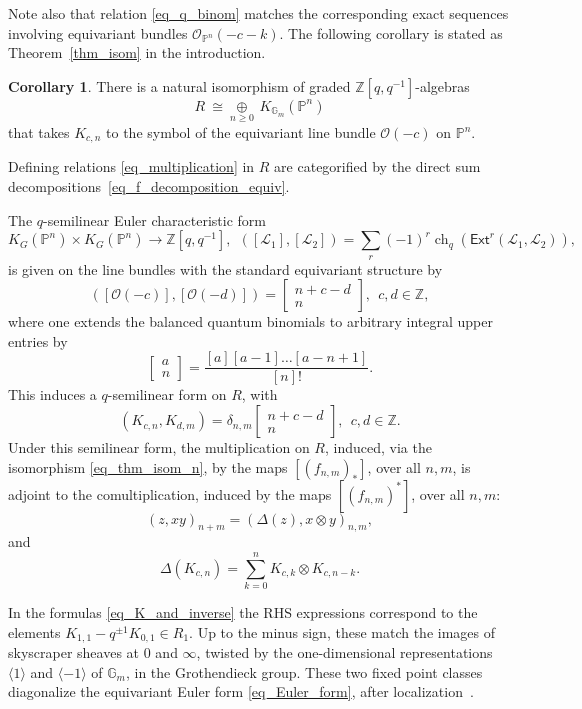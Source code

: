 \documentclass{article}
\def\lra{\longrightarrow}
\def\Ext{\mathsf{Ext}}
\def\Z{\mathbb Z}
\newcommand{\mcO}{\mathcal{O}}
\newcommand{\mcL}{\mathcal{L}}
\newcommand{\PP}{\mathbb{P}}
\DeclareMathOperator{\ch}{ch}
\newcommand{\bbinom}[2]{
  \begin{bmatrix}
    #1 \\
    #2
  \end{bmatrix}
}
\newcommand{\oplusop}[1]{{\mathop{\oplus}\limits_{#1}}}
\theoremstyle{definition}
\newtheorem{cor}[thm]{Corollary}
\theoremstyle{definition}
\begin{document}
Note also that relation \eqref{eq_q_binom} matches the corresponding exact sequences involving equivariant bundles $\mcO_{\PP^n}(-c-k)$.
The following corollary is stated as Theorem~\ref{thm_isom} in the introduction.
\begin{cor}\label{cor_isom}
    There is a natural isomorphism of graded $\Z[q,q^{-1}]$-algebras
    \begin{equation}\label{eq_thm_isom_n}
    R\ \cong \oplusop{n\ge 0}\, K_{\mathbb{G}_m}(\PP^n)
    \end{equation}
    that takes $K_{c,n}$ to the symbol of the equivariant line bundle $\mcO(-c)$ on $\PP^n$.
\end{cor}
Defining relations \eqref{eq_multiplication} in $R$ are categorified by the direct sum decompositions~\eqref{eq_f_decomposition_equiv}.

The $q$-semilinear Euler characteristic form
\begin{equation}\label{eq_Euler_form}
K_G(\PP^n) \times K_G(\PP^n) \lra \Z[q,q^{-1}], \ \
([\mcL_1],[\mcL_2]) = \sum_r (-1)^r \ch_q(\Ext^r(\mcL_1,\mcL_2)),
\end{equation}
is given on the line bundles with the standard equivariant structure by
\[
([\mcO(-c)],[\mcO(-d)]) = \bbinom{n+c-d}{n}, \ \ c,d\in \Z,
\]
where one extends the balanced quantum binomials to arbitrary integral upper entries by
\[
\bbinom{a}{n}=\frac{[a][a-1]\dots [a-n+1]}{[n]!}.
\]
This induces a $q$-semilinear form on $R$, with
\[
(K_{c,n},K_{d,m}) = \delta_{n,m}\bbinom{n+c-d}{n}, \ \ c,d\in \Z.
\]
Under this semilinear form, the multiplication on $R$, induced, via the isomorphism \eqref{eq_thm_isom_n}, by the maps $[(f_{n,m})_{\ast}]$, over all $n,m$, is adjoint to the comultiplication, induced by the maps $[(f_{n,m})^{\ast}]$, over all $n,m$:
\[
(z,xy )_{n+m}=(\Delta(z),x\otimes y)_{n,m},
\]
and
\[
\Delta(K_{c,n})=
\sum_{k=0}^n K_{c,k}\otimes K_{c,n-k}.
\]

In the formulas \eqref{eq_K_and_inverse} the RHS expressions correspond to the elements $K_{1,1}-q^{\pm 1} K_{0,1}\in R_1$. Up to the minus sign, these match the images of skyscraper sheaves at $0$ and $\infty$, twisted by the one-dimensional representations $\langle 1\rangle$ and $\langle -1\rangle$ of $\mathbb{G}_m$, in the Grothendieck group. These two fixed point classes diagonalize the equivariant Euler form \eqref{eq_Euler_form}, after localization~\cite[\S 2.3]{Okounkov}.
\end{document}
